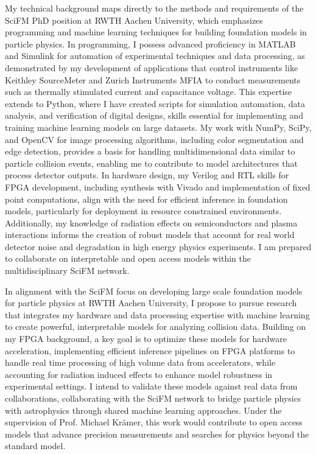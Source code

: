 \documentclass[a4paper,12pt]{article}
\begin{document}
My technical background maps directly to the methods and requirements of the SciFM PhD position at RWTH Aachen University, which emphasizes programming and machine learning techniques for building foundation models in particle physics. In programming, I possess advanced proficiency in MATLAB and Simulink for automation of experimental techniques and data processing, as demonstrated by my development of applications that control instruments like Keithley SourceMeter and Zurich Instruments MFIA to conduct measurements such as thermally stimulated current and capacitance voltage. This expertise extends to Python, where I have created scripts for simulation automation, data analysis, and verification of digital designs, skills essential for implementing and training machine learning models on large datasets. My work with NumPy, SciPy, and OpenCV for image processing algorithms, including color segmentation and edge detection, provides a basis for handling multidimensional data similar to particle collision events, enabling me to contribute to model architectures that process detector outputs. In hardware design, my Verilog and RTL skills for FPGA development, including synthesis with Vivado and implementation of fixed point computations, align with the need for efficient inference in foundation models, particularly for deployment in resource constrained environments. Additionally, my knowledge of radiation effects on semiconductors and plasma interactions informs the creation of robust models that account for real world detector noise and degradation in high energy physics experiments. I am prepared to collaborate on interpretable and open access models within the multidisciplinary SciFM network.

\vspace{5pt}

In alignment with the SciFM focus on developing large scale foundation models for particle physics at RWTH Aachen University, I propose to pursue research that integrates my hardware and data processing expertise with machine learning to create powerful, interpretable models for analyzing collision data. Building on my FPGA background, a key goal is to optimize these models for hardware acceleration, implementing efficient inference pipelines on FPGA platforms to handle real time processing of high volume data from accelerators, while accounting for radiation induced effects to enhance model robustness in experimental settings. I intend to validate these models against real data from collaborations, collaborating with the SciFM network to bridge particle physics with astrophysics through shared machine learning approaches. Under the supervision of Prof. Michael Krämer, this work would contribute to open access models that advance precision measurements and searches for physics beyond the standard model.
\end{document}
